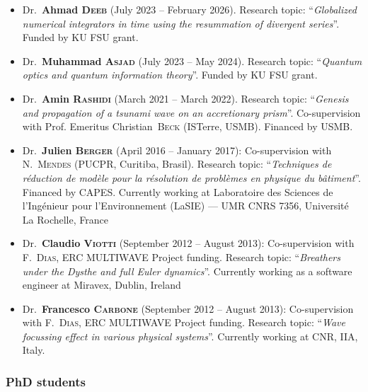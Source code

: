 \documentclass[final, a4paper, oneside, 12pt]{article}
\numberwithin{equation}{section}
\begin{document}
\begin{itemize}

  \item Dr.~\textbf{Ahmad \textsc{Deeb}} (July 2023 -- February 2026). Research topic: ``\textit{Globalized numerical integrators in time using the resummation of divergent series}''. Funded by KU FSU grant.

  \item Dr.~\textbf{Muhammad \textsc{Asjad}} (July 2023 -- May 2024). Research topic: ``\textit{Quantum optics and quantum information theory}''. Funded by KU FSU grant.

  \item Dr.~\textbf{Amin \textsc{Rashidi}} (March 2021 -- March 2022). Research topic: ``\textit{Genesis and propagation of a tsunami wave on an accretionary prism}''. Co-supervision with Prof. Emeritus Christian~\textsc{Beck} (ISTerre, USMB). Financed by USMB.

  \item Dr.~\textbf{Julien \textsc{Berger}} (April 2016 -- January 2017): Co-supervision with N.~\textsc{Mendes} (PUCPR, Curitiba, Brasil). Research topic: ``\textit{Techniques de r\'eduction de mod\`ele pour la r\'esolution de probl\`emes en physique du b\^atiment}''. Financed by CAPES. Currently working at Laboratoire des Sciences de l'Ing\'enieur pour l'Environnement (LaSIE) --- UMR CNRS 7356, Universit\'e La Rochelle, France
  
  \item Dr.~\textbf{Claudio \textsc{Viotti}} (September 2012 -- August 2013): Co-supervision with F.~\textsc{Dias}, ERC MULTIWAVE Project funding. Research topic: ``\textit{Breathers under the Dysthe and full Euler dynamics}''. Currently working as a software engineer at Miravex, Dublin, Ireland
  
  \item Dr.~\textbf{Francesco \textsc{Carbone}} (September 2012 -- August 2013): Co-supervision with F.~\textsc{Dias}, ERC MULTIWAVE Project funding. Research topic: ``\textit{Wave focussing effect in various physical systems}''. Currently working at CNR, IIA, Italy.

\end{itemize}

\subsubsection{PhD students}
\end{document}
